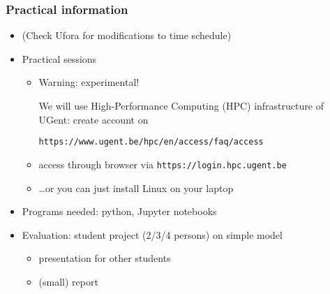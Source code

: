 \documentclass[aspectratio=43,9pt]{beamer}
\begin{document}
\begin{frame}
	\frametitle{Practical information}
	\begin{itemize}
		\item (Check Ufora for modifications to time schedule)\vspace*{2ex}
		\item Practical sessions\vspace*{1ex}
			\begin{itemize}
				\item Warning: experimental!\vspace*{1ex}
					\par
					We will use High-Performance Computing (HPC) infrastructure of UGent: create account on\vspace*{1ex}
					\par
					\texttt{https://www.ugent.be/hpc/en/access/faq/access}\vspace*{1ex}
				\item access through browser via \texttt{https://login.hpc.ugent.be}\vspace*{1ex}
				\item \ldots or you can just install Linux on your laptop\vspace*{2ex}
			\end{itemize}
		\item Programs needed: python, Jupyter notebooks\vspace*{2ex}
		\item Evaluation: student project (2/3/4 persons) on simple model\vspace*{1ex}
			\begin{itemize}
				\item presentation for other students\vspace*{1ex}
				\item (small) report
			\end{itemize}
	\end{itemize}
\end{frame}
%
%
\begin{frame}
	\begin{center}
	\end{center}
\end{frame}
%
%
\end{document}
